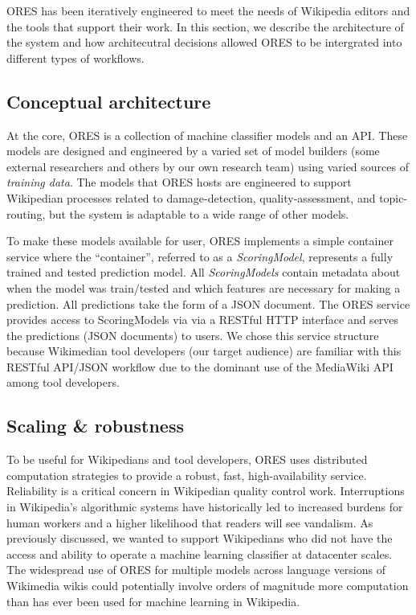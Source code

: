 
ORES has been iteratively engineered to meet the needs of Wikipedia editors and the tools that support their work.  In this section, we describe the architecture of the system and how architecutral decisions allowed ORES to be intergrated into different types of workflows.

\subsection{Conceptual architecture}
At the core, ORES is a collection of machine classifier models and an API.  These models are designed and engineered by a varied set of model builders (some external researchers and others by our own research team) using varied sources of \emph{training data}.  The models that ORES hosts are engineered to support Wikipedian processes related to damage-detection, quality-assessment, and topic-routing, but the system is adaptable to a wide range of other models.

To make these models available for user, ORES implements a simple container service where the ``container'', referred to as a \emph{ScoringModel}, represents a fully trained and tested prediction model.  All \emph{ScoringModels} contain metadata about when the model was train/tested and which features are necessary for making a prediction.  All predictions take the form of a JSON document.  The ORES service provides access to ScoringModels via via a RESTful HTTP interface and serves the predictions (JSON documents) to users.  We chose this service structure because Wikimedian tool developers (our target audience) are familiar with this RESTful API/JSON workflow due to the dominant use of the MediaWiki API among tool developers.

\subsection{Scaling \& robustness}
To be useful for Wikipedians and tool developers, ORES uses distributed computation strategies to provide a robust, fast, high-availability service.  Reliability is a critical concern in Wikipedian quality control work.  Interruptions in Wikipedia's algorithmic systems have historically led to increased burdens for human workers and a higher likelihood that readers will see vandalism\cite{geiger2013levee}.  As previously discussed, we wanted to support Wikipedians who did not have the access and ability to operate a machine learning classifier at datacenter scales. The widespread use of ORES for multiple models across language versions of Wikimedia wikis could potentially involve orders of magnitude more computation than has ever been used for machine learning in Wikipedia.


